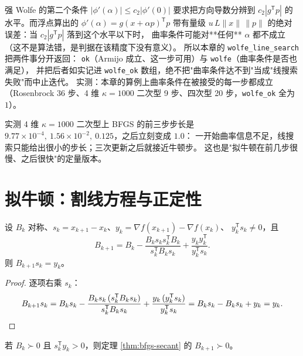 \begin{remark}
强 Wolfe 的第二个条件 $|\phi'(\alpha)|\le c_2|\phi'(0)|$ 要求把方向导数分辨到
$c_2|g^{\mathsf T}p|$ 的水平。而浮点算出的 $\phi'(\alpha)=g(x+\alpha p)^{\mathsf T}p$
带有量级 $u\,L\|x\|\,\|p\|$ 的绝对误差：当 $c_2|g^{\mathsf T}p|$ 落到这个水平以下时，
曲率条件可能对**任何** $\alpha$ 都不成立（这不是算法错，是判据在该精度下没有意义）。
所以本章的 \texttt{wolfe\_line\_search} 把两件事分开返回：
\texttt{ok}（Armijo 成立、这一步可用）与 \texttt{wolfe}（曲率条件是否也满足），
并把后者如实记进 \texttt{wolfe\_ok} 数组，绝不把"曲率条件达不到"当成"线搜索失败"而中止迭代。
实测：本章的算例上曲率条件在被接受的每一步都成立
（Rosenbrock 36 步、4 维 $\kappa=1000$ 二次型 9 步、四次型 20 步，\texttt{wolfe\_ok} 全为 $1$）。
\end{remark}

\begin{remark}
实测 4 维 $\kappa=1000$ 二次型上 BFGS 的前三步步长是
$9.77\times10^{-4},\ 1.56\times10^{-2},\ 0.125$，之后立刻变成 $1.0$：
一开始曲率信息不足，线搜索只能给出很小的步长；三次更新之后就接近牛顿步。
这也是"拟牛顿在前几步很慢、之后很快"的定量版本。
\end{remark}

\section{拟牛顿：割线方程与正定性}

\begin{theorem}
\label{thm:bfgs-secant}
设 $B_k$ 对称、$s_k=x_{k+1}-x_k$、$y_k=\nabla f(x_{k+1})-\nabla f(x_k)$、
$y_k^{\mathsf T}s_k\ne0$，且
\[
  B_{k+1}=B_k-\frac{B_ks_ks_k^{\mathsf T}B_k}{s_k^{\mathsf T}B_ks_k}
  +\frac{y_ky_k^{\mathsf T}}{y_k^{\mathsf T}s_k}.
\]
则 $B_{k+1}s_k=y_k$。
\end{theorem}

\begin{proof}
逐项右乘 $s_k$：
\[
  B_{k+1}s_k=B_ks_k-\frac{B_ks_k\,(s_k^{\mathsf T}B_ks_k)}{s_k^{\mathsf T}B_ks_k}
  +\frac{y_k\,(y_k^{\mathsf T}s_k)}{y_k^{\mathsf T}s_k}
  =B_ks_k-B_ks_k+y_k=y_k . \qedhere
\]
\end{proof}

\begin{theorem}
\label{thm:bfgs-pd}
若 $B_k\succ0$ 且 $s_k^{\mathsf T}y_k>0$，则定理 \ref{thm:bfgs-secant} 的 $B_{k+1}\succ0$。
\end{theorem}

